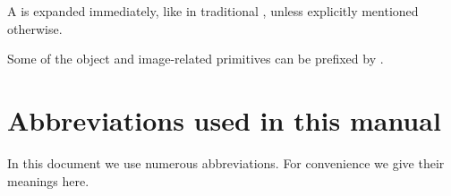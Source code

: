 \documentclass{pdftexmanual}
\begin{document}
{



\endgroup %

\medskip

A  is expanded immediately, like 
in traditional \TEX, unless explicitly mentioned otherwise.

Some of the object and image-related primitives can be prefixed by
.

\chapter{Abbreviations used in this manual}

In this document we use numerous abbreviations. For convenience we give
their meanings here.

\abbrevlist

\twocolumn {\small \emergencystretch=1.5em  }
\end{document}
